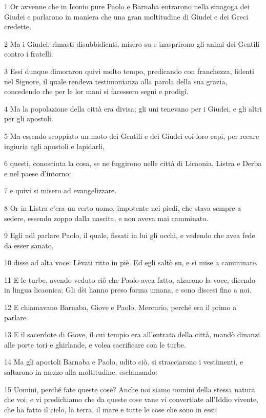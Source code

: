 \par 1 Or avvenne che in Iconio pure Paolo e Barnaba entrarono nella sinagoga dei Giudei e parlarono in maniera che una gran moltitudine di Giudei e dei Greci credette.
\par 2 Ma i Giudei, rimasti disubbidienti, misero su e inasprirono gli animi dei Gentili contro i fratelli.
\par 3 Essi dunque dimoraron quivi molto tempo, predicando con franchezza, fidenti nel Signore, il quale rendeva testimonianza alla parola della sua grazia, concedendo che per le lor mani si facessero segni e prodigî.
\par 4 Ma la popolazione della città era divisa; gli uni tenevano per i Giudei, e gli altri per gli apostoli.
\par 5 Ma essendo scoppiato un moto dei Gentili e dei Giudei coi loro capi, per recare ingiuria agli apostoli e lapidarli,
\par 6 questi, conosciuta la cosa, se ne fuggirono nelle città di Licaonia, Listra e Derba e nel paese d'intorno;
\par 7 e quivi si misero ad evangelizzare.
\par 8 Or in Listra c'era un certo uomo, impotente nei piedi, che stava sempre a sedere, essendo zoppo dalla nascita, e non aveva mai camminato.
\par 9 Egli udì parlare Paolo, il quale, fissati in lui gli occhi, e vedendo che avea fede da esser sanato,
\par 10 disse ad alta voce: Lèvati ritto in piè. Ed egli saltò su, e si mise a camminare.
\par 11 E le turbe, avendo veduto ciò che Paolo avea fatto, alzarono la voce, dicendo in lingua licaonica: Gli dèi hanno preso forma umana, e sono discesi fino a noi.
\par 12 E chiamavano Barnaba, Giove e Paolo, Mercurio, perché era il primo a parlare.
\par 13 E il sacerdote di Giove, il cui tempio era all'entrata della città, mandò dinanzi alle porte tori e ghirlande, e volea sacrificare con le turbe.
\par 14 Ma gli apostoli Barnaba e Paolo, udito ciò, si stracciarono i vestimenti, e saltarono in mezzo alla moltitudine, esclamando:
\par 15 Uomini, perché fate queste cose? Anche noi siamo uomini della stessa natura che voi; e vi predichiamo che da queste cose vane vi convertiate all'Iddio vivente, che ha fatto il cielo, la terra, il mare e tutte le cose che sono in essi;
